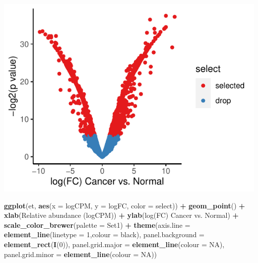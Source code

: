 \documentclass[
]{article}
\newenvironment{Shaded}{\begin{snugshade}}{\end{snugshade}}
\newcommand{\AttributeTok}[1]{\textcolor[rgb]{0.13,0.29,0.53}{#1}}
\newcommand{\ConstantTok}[1]{\textcolor[rgb]{0.56,0.35,0.01}{#1}}
\newcommand{\DecValTok}[1]{\textcolor[rgb]{0.00,0.00,0.81}{#1}}
\newcommand{\FunctionTok}[1]{\textcolor[rgb]{0.13,0.29,0.53}{\textbf{#1}}}
\newcommand{\NormalTok}[1]{#1}
\newcommand{\SpecialCharTok}[1]{\textcolor[rgb]{0.81,0.36,0.00}{\textbf{#1}}}
\newcommand{\StringTok}[1]{\textcolor[rgb]{0.31,0.60,0.02}{#1}}
\begin{document}
\includegraphics{workshop_files/figure-latex/unnamed-chunk-51-1.pdf}

\begin{Shaded}
\begin{Highlighting}[]

\FunctionTok{ggplot}\NormalTok{(et, }\FunctionTok{aes}\NormalTok{(}\AttributeTok{x =}\NormalTok{ logCPM, }\AttributeTok{y =}\NormalTok{ logFC, }\AttributeTok{color =}\NormalTok{ select)) }\SpecialCharTok{+} \FunctionTok{geom\_point}\NormalTok{() }\SpecialCharTok{+}
  \FunctionTok{xlab}\NormalTok{(}\StringTok{\textquotesingle{}Relative abundance (logCPM)\textquotesingle{}}\NormalTok{) }\SpecialCharTok{+} \FunctionTok{ylab}\NormalTok{(}\StringTok{\textquotesingle{}log(FC) Cancer vs. Normal\textquotesingle{}}\NormalTok{) }\SpecialCharTok{+} 
  \FunctionTok{scale\_color\_brewer}\NormalTok{(}\AttributeTok{palette =} \StringTok{\textquotesingle{}Set1\textquotesingle{}}\NormalTok{) }\SpecialCharTok{+}
  \FunctionTok{theme}\NormalTok{(}\AttributeTok{axis.line =} \FunctionTok{element\_line}\NormalTok{(}\AttributeTok{linetype =} \DecValTok{1}\NormalTok{,}\AttributeTok{colour =} \StringTok{\textquotesingle{}black\textquotesingle{}}\NormalTok{),}
        \AttributeTok{panel.background =} \FunctionTok{element\_rect}\NormalTok{(}\FunctionTok{I}\NormalTok{(}\DecValTok{0}\NormalTok{)),}
        \AttributeTok{panel.grid.major =} \FunctionTok{element\_line}\NormalTok{(}\AttributeTok{colour =} \ConstantTok{NA}\NormalTok{),}
        \AttributeTok{panel.grid.minor =} \FunctionTok{element\_line}\NormalTok{(}\AttributeTok{colour =} \ConstantTok{NA}\NormalTok{))}
\end{Highlighting}
\end{Shaded}
\end{document}
